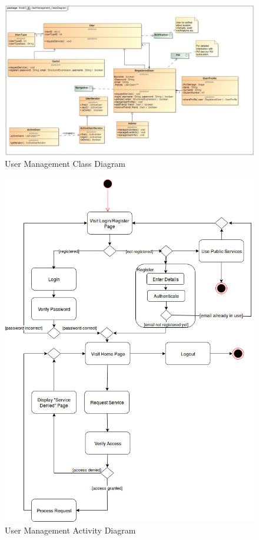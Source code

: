 \documentclass[11pt]{article}
\begin{document}
    \begin{figure}[!h]
        \centering
        \includegraphics[width=\textwidth]{Diagrams/UserManagement/UserManagement_ClassDiagram}
        \caption{User Management Class Diagram}
        \label{fig:user_class}
    \end{figure}
    \begin{figure}[!h]
        \centering
        \includegraphics[width=\textwidth]{Diagrams/UserManagement/UseActivityDiagram}
        \caption{User Management Activity Diagram}
        \label{fig:user_activity}
    \end{figure}
\end{document}
